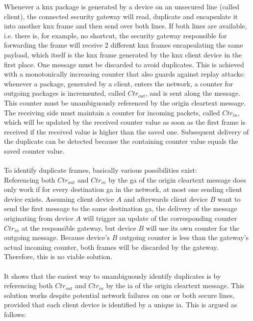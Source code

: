 Whenever a \gls{knx} package is
generated by a device on an unsecured line (called client), the connected security gateway will read, duplicate and encapsulate it into another \gls{knx} frame 
and then send over both lines. If both lines are available, i.e. there is, for example, no shortcut, the security gateway responsible for forwarding the frame
will receive 2 different \gls{knx} frames encapsulating the same
payload, which itself is the \gls{knx} frame generated by the \gls{knx} client device in the first place. 
One message must be discarded to avoid duplicates. 
This is achieved with a monotonically increasing counter that also guards against replay attacks: whenever a package, generated by a client, enters the
network, a counter for outgoing packages is incremented, called $Ctr_{out}$, and is sent along the message. 
This counter must be unambiguously referenced by the origin cleartext message. 
The receiving side must maintain a counter for incoming packets, called $Ctr_{in}$, which will be updated by the received counter value
as soon as the first frame is received if the received value is higher than the saved one.
Subsequent delivery of the duplicate can be detected because the containing counter value equals the saved counter value.
\\
\\
To identify duplicate frames, basically various possibilities exist:
\\
Referencing both $Ctr_{out}$ and $Ctr_{in}$ by the \gls{ga} of the origin cleartext message does only work if for every destination
 \gls{ga} in the network, at most one sending client device exists. Assuming client device $A$ and afterwards client device $B$ want to send the first message to
 the same destination \gls{ga}, the delivery of the message
 originating from device $A$ will trigger an update of the corresponding counter $Ctr_{in}$ at the responsible gateway, but device $B$ will use its own counter
 for the outgoing message. Because device's $B$ outgoing counter is less than the gateway's actual incoming counter, both frames will be discarded by the gateway.
Therefore, this is no viable solution.
\\
\\
It shows that the easiest way to unambiguously identify duplicates is by referencing both $Ctr_{out}$ and $Ctr_{in}$ by the \gls{ia} of the origin
cleartext message. This solution works despite potential network failures on one or both secure lines, provided that each client device is identified by a unique
\gls{ia}. This is argued as follows:

